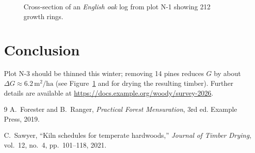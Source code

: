 \documentclass[11pt, a4paper]{article}
\newcommand{\unit}[1]{\,\mathrm{#1}}
\begin{document}
\begin{figure}[htbp]
  \centering
  \fbox{\rule{0pt}{4cm}\rule{0.6\textwidth}{0pt}}
  \caption{Cross-section of an \emph{English oak} log from plot N-1 showing 212 growth rings.}
  \label{fig:rings}
\end{figure}

\section{Conclusion}

Plot N-3 should be thinned this winter; removing 14 pines reduces $G$ by about $\Delta G \approx 6.2\unit{m^2/ha}$ (see Figure~\ref{fig:rings} and \cite{kiln-schedules} for drying the resulting timber). Further details are available at \url{https://docs.example.org/woody/survey-2026}.

\begin{thebibliography}{9}
    A.~Forester and B.~Ranger, \emph{Practical Forest Mensuration}, 3rd ed. Example Press, 2019.

    C.~Sawyer, ``Kiln schedules for temperate hardwoods,'' \textit{Journal of Timber Drying}, vol.~12, no.~4, pp.~101--118, 2021.
\end{thebibliography}
\end{document}
